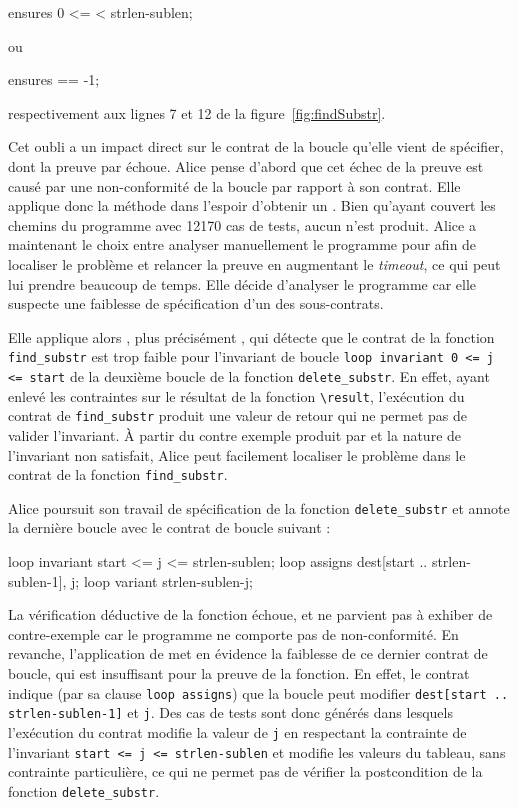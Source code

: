 \begin{pretty-codeACSL}
ensures 0 <= \result < strlen-sublen;
\end{pretty-codeACSL}

ou

\begin{pretty-codeACSL}
ensures \result == -1;
\end{pretty-codeACSL}

respectivement aux lignes 7 et 12 de la figure~\ref{fig:findSubstr}.

Cet oubli a un impact direct sur le contrat de la boucle qu'elle vient de
spécifier, dont la preuve par \Wp échoue.
Alice pense d'abord que cet échec de la preuve est causé par une non-conformité
de la boucle par rapport à son contrat.
Elle applique donc la méthode \NCD dans l'espoir d'obtenir un \NCCE.
Bien qu'ayant couvert les chemins du programme avec 12170 cas de tests, aucun
\NCCE n'est produit.
Alice a maintenant le choix entre analyser manuellement le programme pour afin
de localiser le problème et relancer la preuve en augmentant le {\em timeout},
ce qui peut lui prendre beaucoup de temps.
Elle décide d'analyser le programme car elle suspecte une faiblesse de
spécification d'un des sous-contrats.

Elle applique alors \SWD, plus précisément \SSWD, qui détecte que le contrat de
la fonction \lstinline'find_substr' est trop faible pour l'invariant de boucle
\lstinline'loop invariant 0 <= j <= start' de la deuxième boucle de la fonction
\lstinline'delete_substr'.
En effet, ayant enlevé les contraintes sur le résultat de la fonction
\lstinline'\result', l'exécution du contrat de \lstinline'find_substr' produit
une valeur de retour qui ne permet pas de valider l'invariant.
À partir du contre exemple produit par \SSWD et la nature de l'invariant non
satisfait, Alice peut facilement localiser le problème dans le contrat de la
fonction \lstinline'find_substr'.

Alice poursuit son travail de spécification de la fonction
\lstinline'delete_substr' et annote la dernière boucle avec le contrat de boucle
suivant :

\begin{pretty-codeACSL}
loop invariant start <= j <= strlen-sublen;
loop assigns dest[start .. strlen-sublen-1], j;
loop variant strlen-sublen-j;
\end{pretty-codeACSL}

La vérification déductive de la fonction échoue, et \NCD ne parvient pas à
exhiber de contre-exemple car le programme ne comporte pas de non-conformité.
En revanche, l'application de \SWD met en évidence la faiblesse de ce dernier
contrat de boucle, qui est insuffisant pour la preuve de la fonction.
En effet, le contrat indique (par sa clause \lstinline'loop assigns') que la
boucle peut modifier \lstinline'dest[start .. strlen-sublen-1]' et
\lstinline'j'.
Des cas de tests sont donc générés dans lesquels l'exécution du
contrat modifie la valeur de \lstinline'j' en respectant la contrainte de
l'invariant \lstinline'start <= j <= strlen-sublen' et modifie les valeurs du
tableau, sans contrainte particulière, ce qui ne permet pas de vérifier la
postcondition de la fonction \lstinline'delete_substr'.

